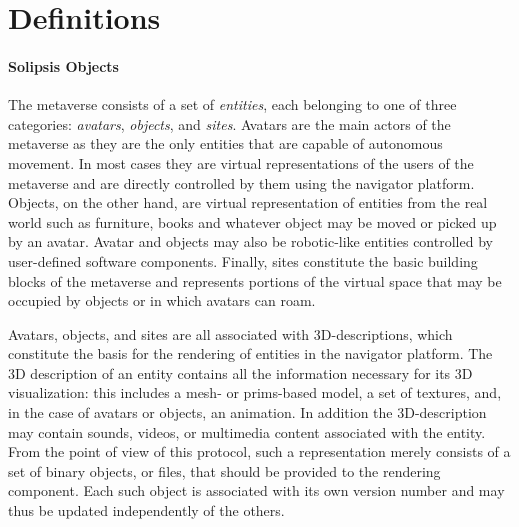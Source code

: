 \section{Definitions}

\paragraph{Solipsis Objects}
The \sol metaverse consists of a set of \emph{entities}, each
belonging to one of three categories: \emph{avatars}, \emph{objects},
and \emph{sites}. Avatars are the main actors of the metaverse as they
are the only entities that are capable of autonomous movement. In most
cases they are virtual representations of the users of the metaverse
and are directly controlled by them using the navigator platform.
Objects, on the other hand, are virtual representation of entities
from the real world such as furniture, books and whatever object may
be moved or picked up by an avatar. Avatar and objects may also be
robotic-like entities controlled by user-defined software
components. Finally, sites constitute the basic building blocks of the
metaverse and represents portions of the virtual space that may be
occupied by objects or in which avatars can roam.


Avatars, objects, and sites are all associated with 3D-descriptions,
which constitute the basis for the rendering of entities in the
navigator platform. The 3D description of an entity contains all the
information necessary for its 3D visualization: this includes a mesh-
or prims-based model, a set of textures, and, in the case of avatars
or objects, an animation. In addition the 3D-description may contain
sounds, videos, or multimedia content associated with the entity. From
the point of view of this protocol, such a representation merely
consists of a set of binary objects, or files, that should be provided
to the rendering component. Each such object is associated with its
own version number and may thus be updated independently of the
others.



